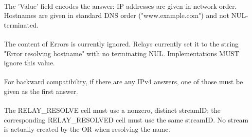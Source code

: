 \paragraph{}
The 'Value' field encodes the answer:
IP addresses are given in network order.
Hostnames are given in standard DNS order ("www.example.com")
and not NUL-terminated.

\paragraph{}
The content of Errors is currently ignored. Relays currently
set it to the string "Error resolving hostname" with no
terminating NUL. Implementations MUST ignore this value.

\paragraph{}
For backward compatibility, if there are any IPv4 answers, one of those
must be given as the first answer.

\paragraph{}
The RELAY\_RESOLVE cell must use a nonzero, distinct streamID; the
corresponding RELAY\_RESOLVED cell must use the same streamID. No stream
is actually created by the OR when resolving the name.